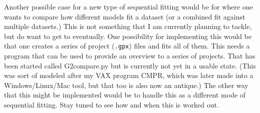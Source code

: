 Another possible case for a new type of sequential fitting would be for where one wants to compare how different models fit a dataset (or a combined fit against multiple datasets.) This is not something that I am currently planning to tackle, but do want to get to eventually. One possibility for implementing this would be that one creates a series of project (\texttt{.gpx}) files and fits all of them. This needs a program that can be used to provide an overview to a series of projects. That has been started called G2compare.py but is currently not yet in a usable state. (This was sort of modeled after my VAX program CMPR, which was later made into a Windows/Linux/Mac tool, but that too is also now an antique.) The other way that this might be implemented would be to handle this as a different mode of sequential fitting. Stay tuned to see how and when this is worked out. 
